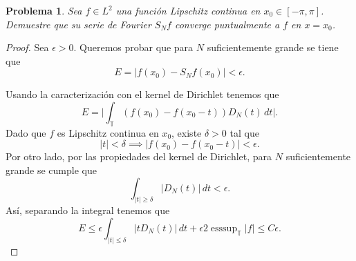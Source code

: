 \documentclass{article}
\theoremstyle{plain}
\newtheorem{Problema}{Problema}
\theoremstyle{definition}
\newcommand{\T}{\mathbb{T}}
\DeclareMathOperator{\esssup}{esssup}
\newcommand{\abs}[1]{\lvert #1 \rvert}
\begin{document}
\noindent{}

\begin{Problema}
  Sea \(f\in L^2\) una función Lipschitz continua en \(x_0 \in [-\pi, \pi]\). 
  Demuestre que su serie de Fourier \(S_N f\) converge puntualmente a \(f\)
  en \(x = x_0\). 
\end{Problema}
\begin{proof}
  Sea \(\epsilon > 0\). Queremos probar que para \(N\) suficientemente grande se tiene que
  \begin{displaymath}
    E = \abs{ f(x_0) - S_N f(x_0) } < \epsilon.
  \end{displaymath}

  Usando la caracterización con el kernel de Dirichlet tenemos que
  \begin{displaymath}
    E = \abs{ \int_{\T} (f(x_0) - f(x_0 - t)) D_N(t) \, dt }.
  \end{displaymath}
  Dado que \(f\) es Lipschitz continua en \(x_0\), existe \(\delta > 0\) tal que
  \begin{displaymath}
    \abs{t} < \delta \implies \abs{ f(x_0) - f(x_0 - t) } < \epsilon.
  \end{displaymath}
  Por otro lado, por las propiedades del kernel de Dirichlet, para \(N\) suficientemente grande
  se cumple que
  \begin{displaymath}
    \int_{\abs{t} \ge \delta} \abs{ D_N(t) } \, dt < \epsilon.
  \end{displaymath}
  Así, separando la integral tenemos que
  \begin{displaymath}
    E \le 
    \epsilon \int_{\abs{t}\le \delta} \abs{t D_N(t)} \, dt
    +
    \epsilon 2 \esssup_{\T} \abs{f}
    \le 
    C \epsilon.
  \end{displaymath}
\end{proof}
\end{document}
